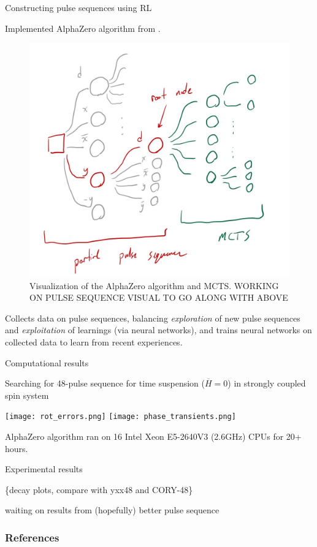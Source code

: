\documentclass{beamer}
\begin{document}
\begin{frame}{Constructing pulse sequences using RL}

Implemented AlphaZero algorithm from \cite{Silver1140}.

\begin{figure}
\centering
\includegraphics[width=.3\textwidth]{mcts.jpg}
\caption{Visualization of the AlphaZero algorithm and MCTS.
WORKING ON PULSE SEQUENCE VISUAL TO GO ALONG WITH ABOVE
}
\end{figure}



Collects data on pulse sequences, balancing \emph{exploration} of new
pulse sequences and \emph{exploitation} of learnings (via neural
networks), and trains neural networks on collected data to learn from
recent experiences.
\end{frame}

\begin{frame}{Computational results}


Searching for 48-pulse sequence for time suspension (\(\overline{H}=0\)) in strongly coupled spin system

\texttt{[image: rot\_errors.png]}
\texttt{[image: phase\_transients.png]}

AlphaZero algorithm ran on 16 Intel Xeon E5-2640V3 (2.6GHz) CPUs for 20+ hours.

\end{frame}

\begin{frame}{Experimental results}

\{decay plots, compare with yxx48 and CORY-48\}

waiting on results from (hopefully) better pulse sequence

\end{frame}

\begin{frame}[allowframebreaks]
\frametitle{References}

\printbibliography

\end{frame}
\end{document}
